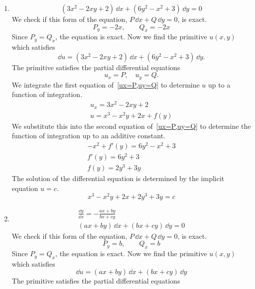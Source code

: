 {  \begin{Solution}
    \label{solution dydx=axbybxcy}
    \begin{enumerate}
    \item
      \[
      (3x^2-2xy+2) \,\dd x+(6y^2-x^2+3) \,\dd y = 0
      \]
      We check if this form of the equation, $P \,\dd x + Q \,\dd y = 0$, is exact.
      \[
      P_y = - 2 x, \qquad Q_x = -2 x
      \]
      Since $P_y = Q_x$, the equation is exact.  Now we find the primitive
      $u(x,y)$ which satisfies 
      \[
      \dd u = (3x^2-2xy+2) \,\dd x+(6y^2-x^2+3) \,\dd y.
      \]
      The primitive satisfies the partial differential equations
      \begin{equation}
        \label{ux=P,uy=Q}
        u_x = P, \quad u_y = Q.
      \end{equation}
      We integrate the first equation of~\ref{ux=P,uy=Q} to determine $u$ up 
      to a function of integration.
      \begin{gather*}
        u_x = 3 x^2 - 2 x y + 2 \\
        u = x^3 - x^2 y + 2 x + f(y)
      \end{gather*}
      We substitute this into the second equation of~\ref{ux=P,uy=Q} to determine
      the function of integration up to an additive constant.
      \begin{gather*}
        -x^2 + f'(y) = 6 y^2 - x^2 + 3 \\
        f'(y) = 6 y^2 + 3 \\
        f(y) = 2 y^3 + 3 y
      \end{gather*}
      The solution of the differential equation is determined by the 
      implicit equation $u = c$.
      \[
      \boxed{
        x^3 - x^2 y + 2 x + 2 y^3 + 3 y = c
        }
      \]
    \item
      \begin{gather*}
        \frac{\dd y}{\dd x} = - \frac{ax+by}{bx+cy} \\
        ( a x + b y ) \,\dd x + ( b x + c y ) \,\dd y = 0
      \end{gather*}
      We check if this form of the equation, $P \,\dd x + Q \,\dd y = 0$, is exact.
      \[
      P_y = b, \qquad Q_x = b
      \]
      Since $P_y = Q_x$, the equation is exact.  Now we find the primitive
      $u(x,y)$ which satisfies 
      \[
      \dd u = ( a x + b y ) \,\dd x + ( b x + c y ) \,\dd y
      \]
      The primitive satisfies the partial differential equations
      \begin{equation}

\end{equation}
\end{enumerate}
\end{Solution}}
